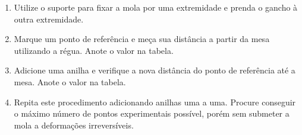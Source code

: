 \begin{enumerate}
	\item Utilize o suporte para fixar a mola por uma extremidade e prenda o gancho à outra extremidade.
	\item Marque um ponto de referência e meça sua distância a partir da mesa utilizando a régua. Anote o valor na tabela.
	\item Adicione uma anilha e verifique a nova distância do ponto de referência até a mesa. Anote o valor na tabela.
	\item Repita este procedimento adicionando anilhas uma a uma. Procure conseguir o máximo número de pontos experimentais possível, porém sem submeter a mola a deformações irreversíveis.
\end{enumerate}

\cleardoublepage


\vspace{15mm}

\begin{fullwidth}
\noindent{}
\vspace{5mm}

\noindent{}

\noindent{}

\noindent{}

\noindent{}

\noindent{}
\end{fullwidth}

\vspace{5mm}

